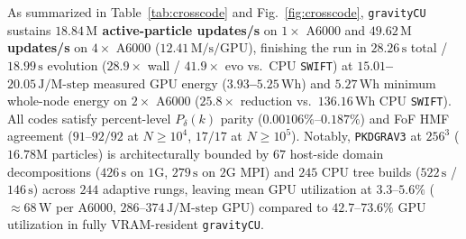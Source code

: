 \documentclass[aps,prd,reprint,superscriptaddress,nofootinbib,amsmath,amssymb,floatfix,longbibliography]{revtex4-2}
\begin{document}
As summarized in Table~\ref{tab:crosscode} and Fig.~\ref{fig:crosscode}, \texttt{gravityCU} sustains \textbf{$18.84\,\mathrm{M}$ active-particle updates/s} on $1\times$ A6000 and \textbf{$49.62\,\mathrm{M}$ updates/s} on $4\times$ A6000 ($12.41\,\mathrm{M/s/GPU}$), finishing the run in $28.26\,\mathrm{s}$ total / $18.99\,\mathrm{s}$ evolution ($28.9\times$ wall / $41.9\times$ evo vs.\ CPU \texttt{SWIFT}) at \textbf{$15.01$--$20.05\,\mathrm{J/M\text{-step}}$} measured GPU energy (\textbf{$3.93$--$5.25\,\mathrm{Wh}$}) and \textbf{$5.27\,\mathrm{Wh}$} minimum whole-node energy on $2\times$ A6000 (\textbf{$25.8\times$} reduction vs.\ $136.16\,\mathrm{Wh}$ CPU \texttt{SWIFT}). All codes satisfy percent-level $P_\delta(k)$ parity ($0.00106\%$--$0.187\%$) and FoF HMF agreement ($91$--$92/92$ at $N\ge 10^4$, $17/17$ at $N\ge 10^5$). Notably, \texttt{PKDGRAV3} at $256^3$ ($16.78\mathrm{M}$ particles) is architecturally bounded by $67$ host-side domain decompositions ($426\,\mathrm{s}$ on $1\mathrm{G}$, $279\,\mathrm{s}$ on $2\mathrm{G}$ MPI) and $245$ CPU tree builds ($522\,\mathrm{s}$ / $146\,\mathrm{s}$) across $244$ adaptive rungs, leaving mean GPU utilization at $3.3$--$5.6\%$ ($\approx 68\,\mathrm{W}$ per A6000, $286$--$374\,\mathrm{J/M\text{-step}}$ GPU) compared to $42.7$--$73.6\%$ GPU utilization in fully VRAM-resident \texttt{gravityCU}.
\end{document}
